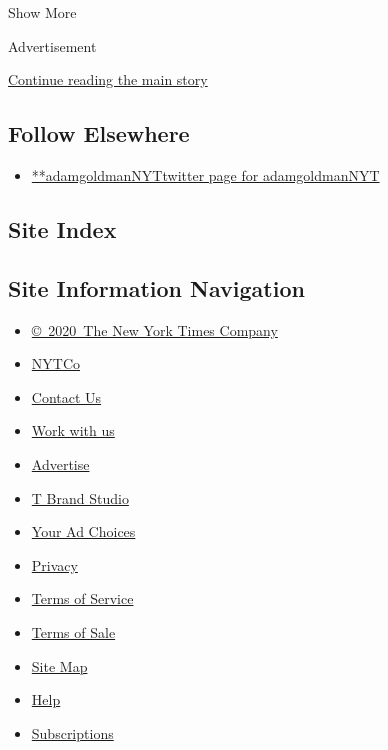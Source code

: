 Show More

Advertisement

\protect\hyperlink{after-mid2}{Continue reading the main story}

\hypertarget{follow-elsewhere}{%
\subsection{Follow Elsewhere}\label{follow-elsewhere}}

\begin{itemize}
\tightlist
\item
  \href{https://twitter.com/adamgoldmanNYT}{**adamgoldmanNYTtwitter page
  for adamgoldmanNYT}
\end{itemize}

\hypertarget{site-index}{%
\subsection{Site Index}\label{site-index}}

\hypertarget{site-information-navigation}{%
\subsection{Site Information
Navigation}\label{site-information-navigation}}

\begin{itemize}
\tightlist
\item
  \href{https://help.nytimes.com/hc/en-us/articles/115014792127-Copyright-notice}{©~2020~The
  New York Times Company}
\end{itemize}

\begin{itemize}
\tightlist
\item
  \href{https://www.nytco.com/}{NYTCo}
\item
  \href{https://help.nytimes.com/hc/en-us/articles/115015385887-Contact-Us}{Contact
  Us}
\item
  \href{https://www.nytco.com/careers/}{Work with us}
\item
  \href{https://nytmediakit.com/}{Advertise}
\item
  \href{http://www.tbrandstudio.com/}{T Brand Studio}
\item
  \href{https://www.nytimes.com/privacy/cookie-policy\#how-do-i-manage-trackers}{Your
  Ad Choices}
\item
  \href{https://www.nytimes.com/privacy}{Privacy}
\item
  \href{https://help.nytimes.com/hc/en-us/articles/115014893428-Terms-of-service}{Terms
  of Service}
\item
  \href{https://help.nytimes.com/hc/en-us/articles/115014893968-Terms-of-sale}{Terms
  of Sale}
\item
  \href{https://spiderbites.nytimes.com}{Site Map}
\item
  \href{https://help.nytimes.com/hc/en-us}{Help}
\item
  \href{https://www.nytimes.com/subscription?campaignId=37WXW}{Subscriptions}
\end{itemize}
